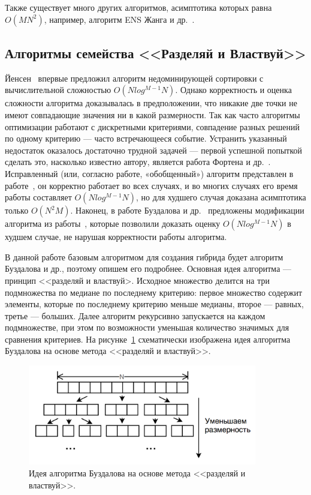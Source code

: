Также существует много других алгоритмов, асимптотика которых равна $O(MN^2)$, например, алгоритм ENS Жанга и др.~\cite{Zhang}.

\subsection{Алгоритмы семейства <<Разделяй и Властвуй>>}

Йенсен~\cite{Jensen} впервые предложил алгоритм недоминирующей сортировки с вычислительной сложностью $O(N log^{M-1} N)$. Однако корректность и оценка сложности алгоритма доказывалась в предположении, что никакие две точки не имеют совпадающие значения ни в какой размерности. Так как часто алгоритмы оптимизации работают с дискретными критериями, совпадение разных решений по одному критерию {---} часто встречающееся событие. Устранить указанный недостаток оказалось достаточно трудной задачей — первой успешной попыткой сделать это, насколько известно автору, является работа Фортена и др.~\cite{Forton}. Исправленный (или, согласно работе, «обобщенный») алгоритм представлен в работе~\cite{Jensen}, он корректно работает во всех случаях, и во многих случаях его время работы составляет $O(N log^{M-1} N)$, но для худшего случая доказана асимптотика только $O(N^2M)$. Наконец, в работе Буздалова и др.~\cite{Buzdalov} предложены модификации алгоритма из работы~\cite{Jensen}, которые позволили доказать оценку $O(N log^{M-1} N)$ в худшем случае, не нарушая корректности работы алгоритма.

В данной работе базовым алгоритмом для создания гибрида будет алгоритм Буздалова и др., поэтому опишем его подробнее. Основная идея алгоритма {---} принцип <<разделяй и властвуй>. Исходное множество делится на три подмножества по медиане по последнему критерию: первое множество содержит элементы, которые по последнему критерию меньше медианы, второе {---} равных, третье {---} больших. Далее алгоритм рекурсивно запускается на каждом подмножестве, при этом по возможности уменьшая количество значимых для сравнения критериев. На рисунке~\ref{fast_pic} схематически изображена идея алгоритма Буздалова на основе метода <<разделяй и властвуй>>.

\begin{figure}[!h]
\begin{center}
\includegraphics[width=10cm]{pic/fast_pic.png}
\caption{Идея алгоритма Буздалова на основе метода <<разделяй и властвуй>>.}
\label{fast_pic}
\end{center}
\end{figure}

